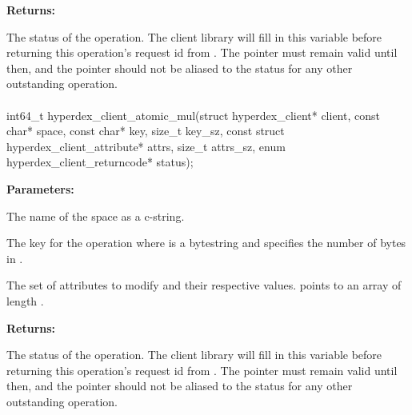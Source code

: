 \noindent\textbf{Returns:}
\begin{description}[labelindent=\widthof{{\code{status}}},leftmargin=*,noitemsep,nolistsep,align=right]
\item[\code{status}] The status of the operation.  The client library will fill in this variable before returning this operation's request id from .  The pointer must remain valid until then, and the pointer should not be aliased to the status for any other outstanding operation.
\end{description}

\paragraph{}
\label{api:c:atomic_mul}
\begin{ccode}
int64_t hyperdex_client_atomic_mul(struct hyperdex_client* client,
                const char* space,
                const char* key, size_t key_sz,
                const struct hyperdex_client_attribute* attrs, size_t attrs_sz,
                enum hyperdex_client_returncode* status);
\end{ccode}
\funcdesc 

\noindent\textbf{Parameters:}
\begin{description}[labelindent=\widthof{{\code{attrs}, \code{attrs\_sz}}},leftmargin=*,noitemsep,nolistsep,align=right]
\item[\code{space}] The name of the space as a c-string.
\item[\code{key}, \code{key\_sz}] The key for the operation where  is a bytestring and  specifies the number of bytes in .
\item[\code{attrs}, \code{attrs\_sz}] The set of attributes to modify and their respective values.   points to an array of length .
\end{description}

\noindent\textbf{Returns:}
\begin{description}[labelindent=\widthof{{\code{status}}},leftmargin=*,noitemsep,nolistsep,align=right]
\item[\code{status}] The status of the operation.  The client library will fill in this variable before returning this operation's request id from .  The pointer must remain valid until then, and the pointer should not be aliased to the status for any other outstanding operation.
\end{description}

